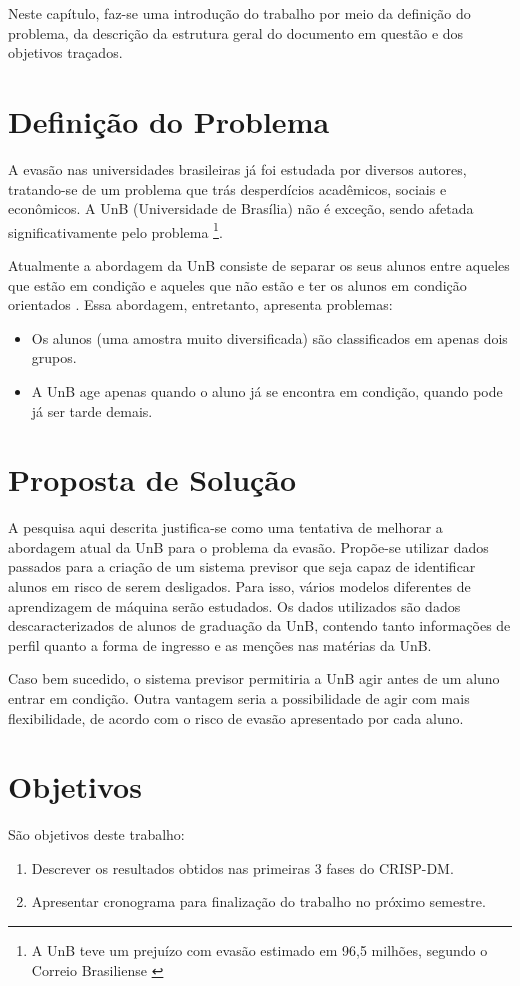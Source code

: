 Neste capítulo, faz-se uma introdução do trabalho por meio da definição do problema,
da descrição da estrutura geral do documento em questão e dos objetivos traçados.

\section{Definição do Problema}
A evasão nas universidades brasileiras já foi estudada por diversos autores,
tratando-se de um problema que trás desperdícios acadêmicos, sociais e econômicos.
A UnB (Universidade de Brasília) não é exceção, sendo afetada significativamente pelo
problema \footnote{A UnB teve um prejuízo com evasão estimado em 96,5 milhões,
segundo o Correio Brasiliense \cite{correio}}.

\par Atualmente a abordagem da UnB consiste de separar os seus alunos entre aqueles
que estão em condição e aqueles que não estão e ter os alunos em condição orientados
\cite{manual_calouro}. Essa abordagem, entretanto, apresenta problemas:
\begin{itemize}
    \item Os alunos (uma amostra muito diversificada) são classificados em apenas
dois grupos.
    \item A UnB age apenas quando o aluno já se encontra em condição, quando pode
já ser tarde demais.
\end{itemize}

\section{Proposta de Solução}
A pesquisa aqui descrita justifica-se como uma tentativa de melhorar a abordagem
atual da UnB para o problema da evasão. Propõe-se utilizar dados passados para
a criação de um sistema previsor que seja capaz de identificar alunos em risco de
serem desligados. Para isso, vários modelos diferentes de aprendizagem de máquina
serão estudados. Os dados utilizados são dados descaracterizados de alunos de
graduação da UnB, contendo tanto informações de perfil quanto a forma de ingresso e
as menções nas matérias da UnB.
\par Caso bem sucedido, o sistema previsor permitiria a UnB agir antes de um aluno
entrar em condição. Outra vantagem seria a possibilidade de agir com mais
flexibilidade, de acordo com o risco de evasão apresentado por cada aluno.

\section{Objetivos}
São objetivos deste trabalho: 
\begin{enumerate}
    \item Descrever os resultados obtidos nas primeiras 3 fases do CRISP-DM.
    \item Apresentar cronograma para finalização do trabalho no próximo semestre.
\end{enumerate}

